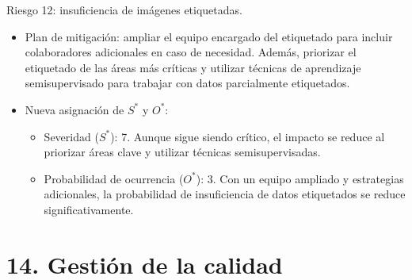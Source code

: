 \documentclass[
11pt, %
]{charter}
\begin{document}
Riesgo 12: insuficiencia de imágenes etiquetadas.
\begin{itemize}
  \item Plan de mitigación: ampliar el equipo encargado del etiquetado para incluir colaboradores adicionales en caso de necesidad. Además, priorizar el etiquetado de las áreas más críticas y utilizar técnicas de aprendizaje semisupervisado para trabajar con datos parcialmente etiquetados.
  \item Nueva asignación de $S^*$ y $O^*$:
        \begin{itemize}
          \item Severidad ($S^*$): 7. Aunque sigue siendo crítico, el impacto se reduce al priorizar áreas clave y utilizar técnicas semisupervisadas.
          \item Probabilidad de ocurrencia ($O^*$): 3. Con un equipo ampliado y estrategias adicionales, la probabilidad de insuficiencia de datos etiquetados se reduce significativamente.
        \end{itemize}
\end{itemize}

\section{14. Gestión de la calidad}
\label{sec:calidad}
\end{document}
